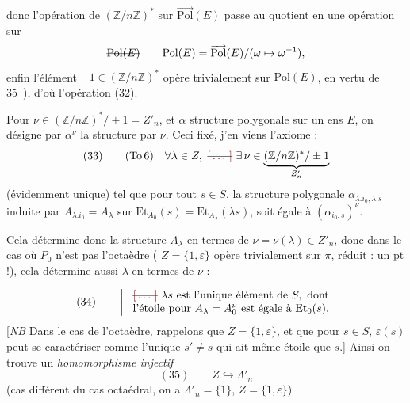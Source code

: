 \documentclass[11pt,a4paper]{article}
\begin{document}
donc l'opération de $(\mathbb{Z}/n\mathbb{Z})^{*}$ sur $\overrightarrow{\mathrm{Pol}}(E)$
passe au quotient en une opération sur
\[
\text{\struck{$\mathrm{Pol}(E)$}}\qquad \mathrm{Pol}(E)=\overrightarrow{\mathrm{Pol}}(E)/(\omega\mapsto\omega^{-1}),
\]
enfin l'élément $-1\in(\mathbb{Z}/n\mathbb{Z})^{*}$ opère
trivialement sur $\mathrm{Pol}(E)$, en vertu de 35~),
d'où l'opération (32).

Pour $\nu\in(\mathbb{Z}/n\mathbb{Z})^{*}/\pm 1=Z'_n$, et
$\alpha$ structure polygonale sur un ens $E$, on
désigne par $\alpha^{\nu}$ la structure \struck{\ill{}} 
par $\nu$. Ceci fixé, j'en viens 
l'axiome  :
\[
(33)\qquad (\mathrm{To}\,6)\quad \forall\lambda\in Z,\ \text{\struck{\ill{}}}\ \exists\,\nu\in\underbrace{(\mathbb{Z}/n\mathbb{Z})^{*}/\pm 1}_{Z'_n}
\]
\quad (évidemment unique) tel que
\quad pour tout $s\in S$, la structure
\quad polygonale  $\alpha_{\lambda.i_0,\lambda.s}$ induite
\quad par $A_{\lambda.i_0}=A_\lambda$ sur $\mathrm{Et}_{A_0}(s)=\mathrm{Et}_{A_\lambda}(\lambda s)$,
\quad soit égale à $(\alpha_{i_0,s})^{\nu}$.

Cela détermine donc la structure $A_\lambda$ en
termes de $\nu=\nu(\lambda)\in Z'_n$,  donc dans le cas
où $P_0$ n'est pas l'octaèdre (\struck{\ill{}}  
$Z=\{1,\varepsilon\}$ opère trivialement sur $\pi$, réduit : un pt !),
cela détermine aussi $\lambda$ en termes de $\nu$ :

\[
(34)\qquad \left|\ \begin{array}{l}
\text{\struck{\ill{}}}\ \lambda s \text{ est l'unique élément de } S, \text{ dont}\\
\text{l'étoile pour } A_\lambda=A_0^{\nu} \text{ est égale à } \mathrm{Et}_0(s).
\end{array}\right.
\]
[\emph{NB} Dans le cas de l'octaèdre, rappelons que $Z=\{1,\varepsilon\}$,
et que pour $s\in S$, $\varepsilon(s)$ peut se caractériser
comme l'unique $s'\neq s$ qui ait même
étoile que $s$.] Ainsi on trouve un
\emph{homomorphisme injectif}
\[
(35)\qquad Z\hookrightarrow\Lambda'_n
\]
\quad (cas différent du cas octaédral,  on a $\Lambda'_n=\{1\}$, $Z=\{1,\varepsilon\}$)
\end{document}
